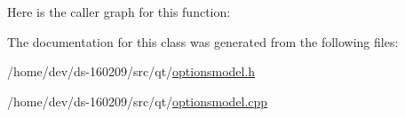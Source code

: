 Here is the caller graph for this function\+:




The documentation for this class was generated from the following files\+:\begin{DoxyCompactItemize}
\item 
/home/dev/ds-\/160209/src/qt/\hyperlink{optionsmodel_8h}{optionsmodel.\+h}\item 
/home/dev/ds-\/160209/src/qt/\hyperlink{optionsmodel_8cpp}{optionsmodel.\+cpp}\end{DoxyCompactItemize}
